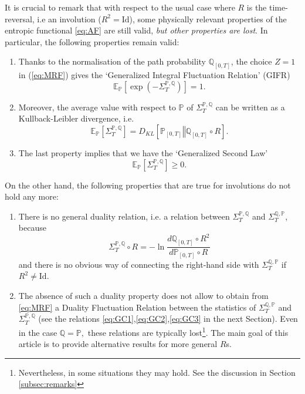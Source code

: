 \documentclass[a4paper,11pt]{article}
\numberwithin{equation}{section}
\begin{document}
It is crucial to remark that with respect to the usual case \cite{Mae99,LS99,CG08,Sei12,Rol+24} where $R$ is the time-reversal, i.e an involution ($R^{2}=\mathrm{Id}$), some physically relevant properties of the entropic functional \eqref{eq:AF} are still valid, \emph{but other properties are lost}. In particular, the following properties remain valid:
\begin{enumerate}
\item Thanks to the normalisation of the path probability $\mathbb{Q}_{\left[0,T\right]}$,
the choice $Z=1$ in (\ref{eq:MRF}) gives the `Generalized
Integral Fluctuation Relation' (GIFR)
$$
\mathbb{E}_{\mathbb{P}}\left[\exp\left(-\varSigma_{T}^{\mathbb{P},\mathbb{Q}}\right)\right]=1.
$$
\item Moreover, the average value with respect to $\mathbb{P}$ of $\varSigma_{T}^{\mathbb{P},\mathbb{Q}}$ can be written as a Kullback-Leibler divergence, i.e. 
$$
\mathbb{E}_{\mathbb{P}}\left[\varSigma_{T}^{\mathbb{P},\mathbb{Q}}\right]=D_{KL}\left[\left.\mathbb{P}_{\left[0,T\right]}\right\Vert \mathbb{Q}_{\left[0,T\right]}\circ R\right].
$$
\item The last property implies that we have the `Generalized Second Law'
\[
\mathbb{E}_{\mathbb{P}}\left[\varSigma_{T}^{\mathbb{P},\mathbb{Q}}\right]\geq0.
\]
\end{enumerate}
On the other hand, the following properties that are true for involutions do not hold any more:
\begin{enumerate}
\item There is no general duality relation, i.e. a relation between
$\varSigma_{T}^{\mathbb{P},\mathbb{Q}}$ and $\varSigma_{T}^{\mathbb{Q},\mathbb{P}}$, because
$$\varSigma_{T}^{\mathbb{P},\mathbb{Q}}\circ R=-\ln\frac{d\mathbb{Q}_{\left[0,T\right]}\circ R^{2}}{d\mathbb{P}_{\left[0,T\right]}\circ R}$$
and there is no obvious way of connecting the right-hand side with $\varSigma_{T}^{\mathbb{Q},\mathbb{P}}$ if $R^2 \neq \mathrm{Id}$. 
\item The absence of such a duality property does not allow to obtain from
\eqref{eq:MRF} a Duality Fluctuation Relation between the statistics of $\varSigma_{T}^{\mathbb{Q},\mathbb{P}}$ and $\varSigma_{T}^{\mathbb{P},\mathbb{Q}}$
(see the relations \eqref{eq:GC1},\eqref{eq:GC2},\eqref{eq:GC3}
in the next Section). Even in the case $\mathbb{Q}=\mathbb{P},$ these relations are typically lost\footnote{Nevertheless, in some situations they may hold. See the discussion in Section \ref{subsec:remarks}}. The main goal of this article is to provide alternative results for more general $R$s.
\end{enumerate}
\end{document}
